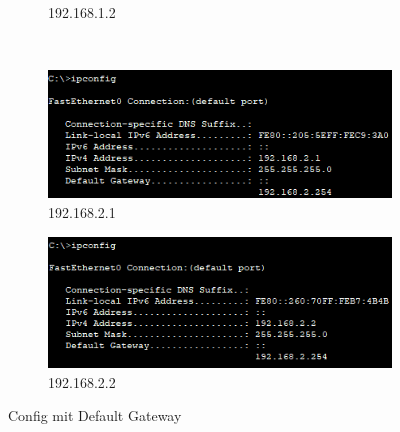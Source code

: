 \begin{figure}[!htb]
\begin{subfigure}{.49\textwidth}
        \caption{192.168.1.2}
    \end{subfigure}
    ~
    \begin{subfigure}{.49\textwidth}
        \includegraphics[width=\textwidth,height=.88\textwidth,keepaspectratio]{./img/ip3.png}
        \caption{192.168.2.1}
    \end{subfigure}
    \begin{subfigure}{.49\textwidth}
        \includegraphics[width=\textwidth,height=.88\textwidth,keepaspectratio]{./img/ip4.png}
        \caption{192.168.2.2}
    \end{subfigure}
    \caption{Config mit Default Gateway}
\end{figure}